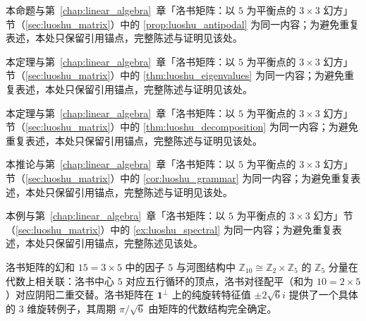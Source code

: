 \begin{proposition}[洛书对径配平]\label{prop:luoshu_antipodal_yijing}
本命题与第~\ref{chap:linear_algebra}~章「洛书矩阵：以 $5$ 为平衡点的 $3\times 3$ 幻方」节（\cref{sec:luoshu_matrix}）中的 \cref{prop:luoshu_antipodal} 为同一内容；为避免重复表述，本处只保留引用锚点，完整陈述与证明见该处。
\end{proposition}

\begin{theorem}[洛书矩阵的特征值与谱结构]\label{thm:luoshu_eigenvalues_yijing}
本定理与第~\ref{chap:linear_algebra}~章「洛书矩阵：以 $5$ 为平衡点的 $3\times 3$ 幻方」节（\cref{sec:luoshu_matrix}）中的 \cref{thm:luoshu_eigenvalues} 为同一内容；为避免重复表述，本处只保留引用锚点，完整陈述与证明见该处。
\end{theorem}

\begin{theorem}\label{thm:luoshu_decomposition_yijing}
本定理与第~\ref{chap:linear_algebra}~章「洛书矩阵：以 $5$ 为平衡点的 $3\times 3$ 幻方」节（\cref{sec:luoshu_matrix}）中的 \cref{thm:luoshu_decomposition} 为同一内容；为避免重复表述，本处只保留引用锚点，完整陈述与证明见该处。
\end{theorem}

\begin{corollary}[洛书平衡点与幻和的结构意义]\label{cor:luoshu_structure}
本推论与第~\ref{chap:linear_algebra}~章「洛书矩阵：以 $5$ 为平衡点的 $3\times 3$ 幻方」节（\cref{sec:luoshu_matrix}）中的 \cref{cor:luoshu_grammar} 为同一内容；为避免重复表述，本处只保留引用锚点，完整陈述与证明见该处。
\end{corollary}

\begin{example}[洛书矩阵的谱分解]\label{ex:luoshu_spectral_yijing}
本例与第~\ref{chap:linear_algebra}~章「洛书矩阵：以 $5$ 为平衡点的 $3\times 3$ 幻方」节（\cref{sec:luoshu_matrix}）中的 \cref{ex:luoshu_spectral} 为同一内容；为避免重复表述，本处只保留引用锚点，完整陈述见该处。
\end{example}

\begin{remark}[洛书矩阵与河图结构的接口]\label{rem:luoshu_hetu_interface_yijing}
洛书矩阵的幻和 $15 = 3 \times 5$ 中的因子 $5$ 与河图结构中 $\mathbb{Z}_{10} \cong \mathbb{Z}_2 \times \mathbb{Z}_5$ 的 $\mathbb{Z}_5$ 分量在代数上相关联：洛书中心 $5$ 对应五行循环的顶点，洛书对径配平（和为 $10 = 2 \times 5$）对应阴阳二重交替。洛书矩阵在 $\mathbf{1}^\perp$ 上的纯旋转特征值 $\pm 2\sqrt{6}i$ 提供了一个具体的 $3$ 维旋转例子，其周期 $\pi/\sqrt{6}$ 由矩阵的代数结构完全确定。
\end{remark}

